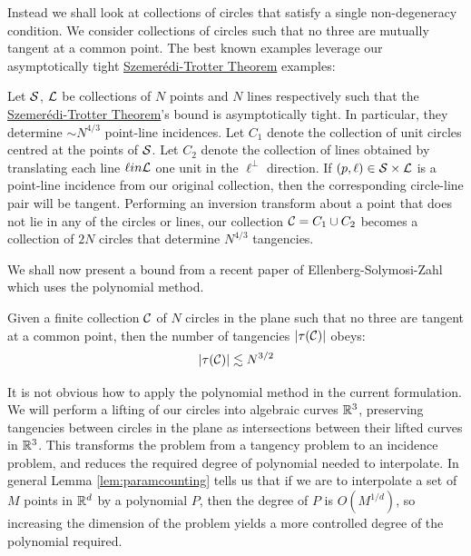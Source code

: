 Instead we shall look at collections of circles that satisfy a single non-degeneracy condition. We consider collections of circles 
such that no three are mutually tangent at a common point. The best known examples leverage our asymptotically tight \hyperref[thm:S-T]{Szemerédi-Trotter Theorem} examples:
\begin{example}
    Let $\mathcal S$, $\mathcal L$ be collections of $N$ points and $N$ lines respectively such that the \hyperref[thm:S-T]{Szemerédi-Trotter Theorem}'s bound is asymptotically tight. 
    In particular, they determine $\sim N^{4/3}$ point-line incidences. 
    Let $C_1$ denote the collection of unit circles centred at the points of $\mathcal S$. 
    Let $C_2$ denote the collection of lines obtained by translating each line $\ell in \mathcal L$ one unit in the $\ell^{\perp}$ direction.
    If $(p,\ell) \in \mathcal S \times \mathcal L$ is a point-line incidence from our original collection, then the corresponding circle-line pair will be tangent.
    Performing an inversion transform about a point that does not lie in any of the circles or lines, our collection $\mathcal C = C_1 \cup C_2$ becomes a 
    collection of $2N$ circles that determine $N^{4/3}$ tangencies. \label{ex:circle-lower-bound}
 \end{example}

We shall now present a bound from a recent paper of Ellenberg-Solymosi-Zahl which uses the polynomial method.\cite{ellenberg2016new}

\begin{theorem}
    Given a finite collection $\mathcal C$ of $N$ circles in the plane such that no three are tangent at a common point, 
    then the number of tangencies $|\tau(\mathcal C)|$ obeys:   \label{thm:circle-tangencies}
    \[
        |\tau(\mathcal C)| \lesssim N^{3/2}
    \]
\end{theorem}

It is not obvious how to apply the polynomial method in the current formulation. 
We will perform a lifting  of our circles into algebraic curves $\mathbb R^3$, 
preserving tangencies between circles in the plane as intersections between their lifted curves in $\mathbb R^3$. 
This transforms the problem from a tangency problem to an incidence problem, and reduces the required degree of polynomial needed to interpolate.
In general Lemma \ref{lem:paramcounting} tells us that if we are to interpolate a set of $M$ points in $\mathbb R^d$ by a polynomial $P$, then the degree of $P$ is $O(M^{1/d})$, 
so increasing the dimension of the problem yields a more controlled degree of the polynomial required.

